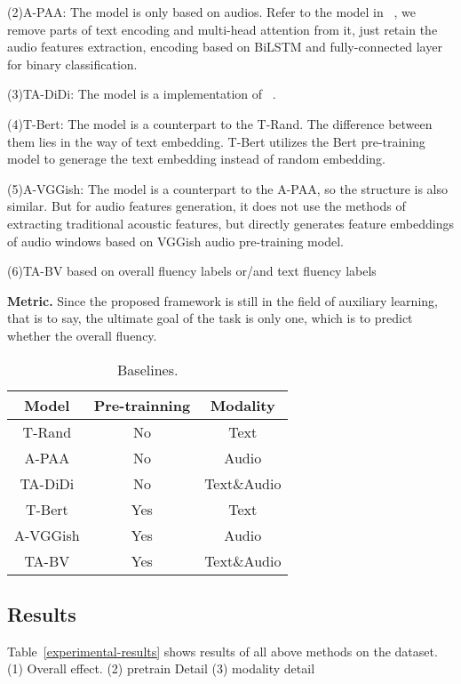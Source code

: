 (2)A-PAA: The model is only based on audios. Refer to the model in ~\cite{didi}, we remove parts of text encoding and multi-head attention from it, just retain the audio features extraction, encoding based on BiLSTM and fully-connected layer for binary classification.

(3)TA-DiDi: The model is a implementation of ~\cite{didi}.

(4)T-Bert: The model is a counterpart to the T-Rand. The difference between them lies in the way of text embedding. T-Bert utilizes the Bert pre-training model to generage the text embedding instead of random embedding.

(5)A-VGGish: The model is a counterpart to the A-PAA, so the structure is also similar. But for audio features generation, it does not use the methods of extracting traditional acoustic features, but directly generates feature embeddings of audio windows based on VGGish audio pre-training model.

(6)TA-BV
 based on overall fluency labels or/and text fluency labels

\textbf{Metric.}
Since the proposed framework is still in the field of auxiliary learning, that is to say, the ultimate goal of the task is only one, which is to predict whether the overall fluency.

 \begin{table}
\centering
\begin{tabular}{ccc}
\hline \textbf{Model} & \textbf{Pre-trainning} & \textbf{Modality} \\ \hline
T-Rand & No & Text \\
A-PAA & No & Audio \\
TA-DiDi & No & Text\&Audio \\
\hline
T-Bert  & Yes & Text \\
A-VGGish & Yes & Audio \\
TA-BV & Yes & Text\&Audio \\
\hline
\end{tabular}
\caption{\label{experimental-baselines} Baselines. }
\end{table}

\subsection{Results}
Table~\ref{experimental-results} shows results of all above methods on the dataset. (1) Overall effect. (2) pretrain Detail (3) modality detail

